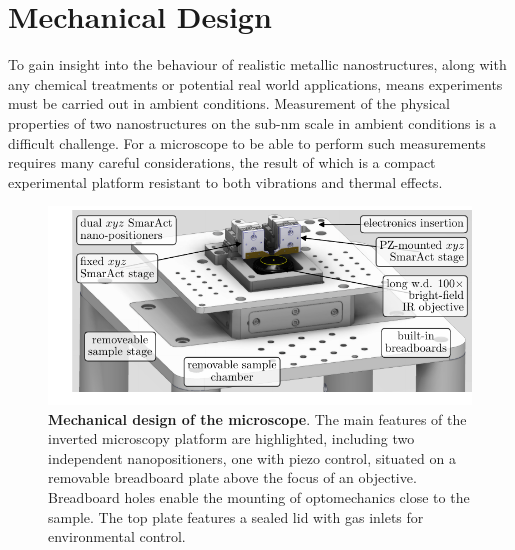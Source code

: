 \documentclass{article}
\begin{document}
\section{Mechanical Design}

To gain insight into the behaviour of realistic metallic nanostructures, along with any chemical treatments or potential real world applications, means experiments must be carried out in ambient conditions. Measurement of the physical properties of two nanostructures on the sub-nm scale in ambient conditions is a difficult challenge. For a microscope to be able to perform such measurements requires many careful considerations, the result of which is a compact experimental platform resistant to both vibrations and thermal effects.

\begin{figure}[tb]
\centering
\includegraphics[clip=true, trim=15 10 0 0]{figures/microscope_stage_design}
\caption[Mechanical design of the microscope]{\textbf{Mechanical design of the microscope}. The main features of the inverted microscopy platform are highlighted, including two independent nanopositioners, one with piezo control, situated on a removable breadboard plate above the focus of an objective. Breadboard holes enable the mounting of optomechanics close to the sample. The top plate features a sealed lid with gas inlets for environmental control.}
\label{fig:mechanical_design}
\end{figure}
\end{document}

